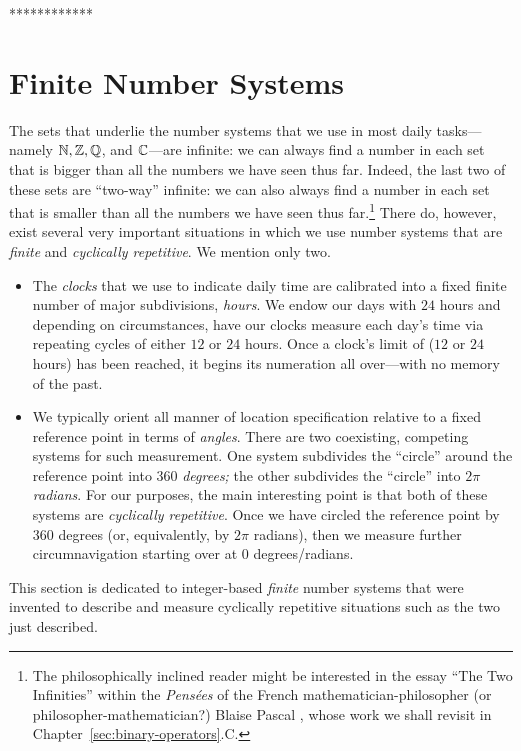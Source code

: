 ************


\section{Finite Number Systems}
\label{sec:congruences+modular}

The sets that underlie the number systems that we use in most daily
tasks---namely $\mathbb{N}, \mathbb{Z}, \mathbb{Q}$, and $\mathbb{C}$---are infinite: we can always
find a number in each set that is bigger than all the numbers we have
seen thus far.  Indeed, the last two of these sets are ``two-way''
infinite: we can also always find a number in each set that is smaller
than all the numbers we have seen thus
far.\footnote{\label{foot:Pascal}The philosophically inclined reader
might be interested in the essay ``The Two Infinities'' within the
{\it Pens\'{e}es} of the French mathematician-philosopher (or
philosopher-mathematician?) Blaise Pascal ,
whose work we shall revisit in Chapter~\ref{sec:binary-operators}.C.}
There do, however, exist several very important situations in which we
use number systems that are {\em finite} and {\em cyclically
  repetitive}.  We mention only two.
\begin{itemize}
\item
The {\em clocks} that we use to indicate daily time are calibrated
into a fixed finite number of major subdivisions, {\em hours}.  We
endow our days with $24$ hours and depending on circumstances, have
our clocks measure each day's time via repeating cycles of either $12$
or $24$ hours.  Once a clock's limit of ($12$ or $24$ hours) has been
reached, it begins its numeration all over---with no memory of the
past.

\item
We typically orient all manner of location specification relative to a
fixed reference point in terms of {\em angles}.  There are two
coexisting, competing systems for such measurement.  One system
subdivides the ``circle'' around the reference point into $360$ {\em
  degrees;} the other subdivides the ``circle'' into $2 \pi$ {\em
  radians}.  For our purposes, the main interesting point is that both
of these systems are {\em cyclically repetitive}.  Once we have
circled the reference point by $360$ degrees (or, equivalently, by $2
\pi$ radians), then we measure further circumnavigation starting over
at $0$ degrees/radians.
\end{itemize}

This section is dedicated to integer-based {\em finite} number systems
that were invented to describe and measure cyclically repetitive
situations such as the two just described.


